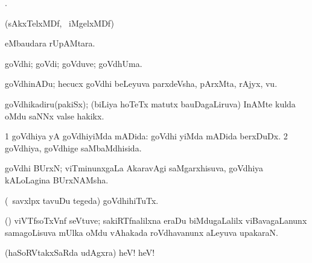 {{{{{{ \bentry
{} 
\expl{}
\bmng
{}. 
\emng
\eentry

\bentry
{} 
\gl{\nA}
\expl{}
\bmng
(sAkxTelxMDf, \kanu\ iMgelxMDf)  
\emng
\eentry

\bentry
{} 
\gl{\nA}
\expl{}
\bmng
{} eMbaudara rUpAMtara. 
\emng
\eentry

\bentry
{} 
\gl{\nA}
\expl{}
\bmng
goVdhi; goVdi; goVduve; goVdhUma. 
\emng

\noindent 
\gl{\pagu}
\expl{}
\bmng
{} 
\emng
\eentry

\bentry 
{} 
\gl{\nA}
\expl{}
\bmng
goVdhinADu; hecucx goVdhi beLeyuva parxdeVsha, pArxMta, rAjyx, \mo vu. 
\emng
\eentry

\bentry
{} 
\gl{\nA}
\expl{}
\bmng
goVdhikadiru(pakiSx); (biLiya hoTeTx matutx bauDagaLiruva) InAMte  kulda oMdu saNNx valse hakikx. 
\emng
\eentry

 
\bentry
{} 
\gl{\gu}
\expl{}
\bmng
\bnum
\num{1} goVdhiya yA goVdhiyiMda mADida:  goVdhi yiMda mADida berxDuDx. 
\num{2} goVdhiya, goVdhige saMbaMdhisida. 
\enum
\emng
\eentry

\bentry
{} 
\gl{\nA}
\expl{}
\bmng
goVdhi BUrxN; viTminunxgaLa AkaravAgi saMgarxhisuva, goVdhiya kALoLagina BUrxNAMsha. 
\emng
\eentry

\bentry
{} 
\gl{\nA}
\expl{}
\bmng
{} 
\emng
\eentry

\bentry
{} 
\gl{\nA}
\expl{}
\bmng
(\kanmu\ savxlpx tavuDu tegeda) goVdhihiTuTx. 
\emng
\eentry

\bentry
{} 
\gl{\nA}
\expl{}
\bmng
(\Bwvi) viVTfsoTxVnf seVtuve; sakiRTfnalilxna eraDu biMdugaLalilx viBavagaLanunx samagoLisuva mUlka oMdu vAhakada roVdhavanunx aLeyuva upakaraN. 
\emng
\eentry

\bentry
{} 
\gl{\BAavayx}
\expl{}
\bmng
(haSoRVtakxSaRda udAgxra) heV! heV! 
\emng
\eentry

}}}}}}
